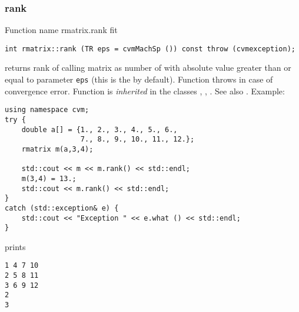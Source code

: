 \subsubsection{rank}
Function%
\pdfdest name {rmatrix.rank} fit
\begin{verbatim}
int rmatrix::rank (TR eps = cvmMachSp ()) const throw (cvmexception);
\end{verbatim}
returns  rank of  calling matrix as  number of
with 
absolute value greater than or
equal to  parameter \verb"eps" (this is the
 by default).
Function throws 
in case of convergence error.
Function is \emph{inherited} in the classes
,
,
.
See also
.
Example:
\begin{Verbatim}
using namespace cvm;
try {
    double a[] = {1., 2., 3., 4., 5., 6.,
                  7., 8., 9., 10., 11., 12.};
    rmatrix m(a,3,4);

    std::cout << m << m.rank() << std::endl;
    m(3,4) = 13.;
    std::cout << m.rank() << std::endl;
}
catch (std::exception& e) {
    std::cout << "Exception " << e.what () << std::endl;
}
\end{Verbatim}
prints
\begin{Verbatim}
1 4 7 10
2 5 8 11
3 6 9 12
2
3
\end{Verbatim}
\newpage




